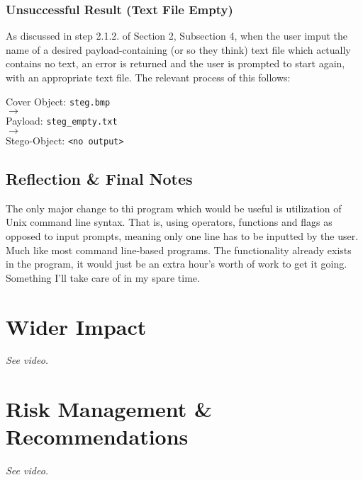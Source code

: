 \documentclass[11pt, english]{article}
\begin{document}
		\subsubsection{Unsuccessful Result (Text File Empty)}

	As discussed in step 2.1.2. of Section 2, Subsection 4, when the user imput the name of a desired payload-containing (or so they think) text file which actually contains no text, an error is returned and the user is prompted to start again, with an appropriate text file. The relevant process of this follows:\\

	\begin{center}
		Cover Object: \verb|steg.bmp|\\ $\longrightarrow$\\ Payload: \verb|steg_empty.txt|\\ $\longrightarrow$\\ Stego-Object: \verb|<no output>|
	\end{center}

	\subsection{Reflection \& Final Notes}

		The only major change to thi program which would be useful is utilization of Unix command line syntax. That is, using operators, functions and flags as opposed to input prompts, meaning only one line has to be inputted by the user. Much like most command line-based programs. The functionality already exists in the program, it would just be an extra hour's worth of work to get it going. Something I'll take care of in my spare time.

\newpage

\section{Wider Impact}

	\textit{See video.}

\newpage

\section{Risk Management \& Recommendations}

	\textit{See video.}

\newpage

\renewcommand\refname{Bibliography}
\end{document}
